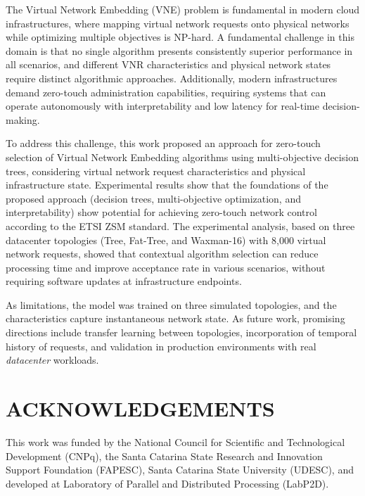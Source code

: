 \documentclass[a4paper,twoside]{article}
\begin{document}
The Virtual Network Embedding (VNE) problem is fundamental in modern cloud infrastructures, where mapping virtual network requests onto physical networks while optimizing multiple objectives is NP-hard. A fundamental challenge in this domain is that no single algorithm presents consistently superior performance in all scenarios, and different VNR characteristics and physical network states require distinct algorithmic approaches. Additionally, modern infrastructures demand zero-touch administration capabilities, requiring systems that can operate autonomously with interpretability and low latency for real-time decision-making.

To address this challenge, this work proposed an approach for zero-touch selection of Virtual Network Embedding algorithms using multi-objective decision trees, considering virtual network request characteristics and physical infrastructure state.
Experimental results show that the foundations of the proposed approach (decision trees, multi-objective optimization, and interpretability) show potential for achieving zero-touch network control according to the ETSI ZSM standard.
The experimental analysis, based on three datacenter topologies (Tree, Fat-Tree, and Waxman-16) with 8,000 virtual network requests, showed that contextual algorithm selection can reduce processing time and improve acceptance rate in various scenarios, without requiring software updates at infrastructure endpoints.

As limitations, the model was trained on three simulated topologies, and the characteristics capture instantaneous network state.
As future work, promising directions include transfer learning between topologies, incorporation of temporal history of requests, and validation in production environments with real \textit{datacenter} workloads.


\section*{\uppercase{Acknowledgements}}

This work was funded by the National Council for Scientific and Technological Development (CNPq), the Santa Catarina State Research and Innovation Support Foundation (FAPESC), Santa Catarina State University (UDESC), and developed at Laboratory of Parallel and Distributed Processing (LabP2D).


{\small
}
\end{document}
